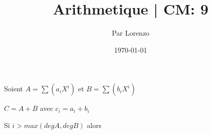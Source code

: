 \documentclass[a4paper, 12pt]{article}
\title{Arithmetique | CM: 9}
\author{Par Lorenzo}
\date{\today}
\begin{document}
\maketitle

\begin{proprietes}
\end{proprietes}

\begin{demonstration}
    Soient $A = \sum(a_i X^i)$ et $B = \sum(b_i X^i)$
    
    $C = A + B$ avec $c_i = a_i + b_i$

    Si $i \gt max(degA, degB)$ alors
\end{demonstration}

\end{document}
